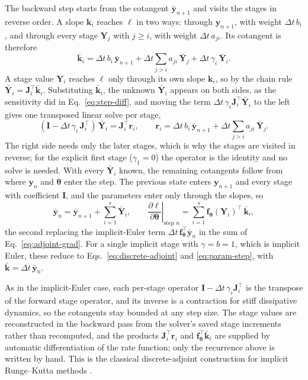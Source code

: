 \documentclass{article}
\begin{document}
The backward step starts from the cotangent \(\bar{\mathbf{y}}_{n+1}\) and visits the stages in reverse order. A slope \(\mathbf{k}_i\) reaches \(\ell\) in two ways: through \(\mathbf{y}_{n+1}\), with weight \(\Delta t\,b_i\), and through every stage \(\mathbf{Y}_j\) with \(j\ge i\), with weight \(\Delta t\,a_{ji}\). Its cotangent is therefore
\[
\bar{\mathbf{k}}_i=\Delta t\,b_i\,\bar{\mathbf{y}}_{n+1}+\Delta t\sum_{j>i}a_{ji}\,\bar{\mathbf{Y}}_j+\Delta t\,\gamma_i\,\bar{\mathbf{Y}}_i .
\]
A stage value \(\mathbf{Y}_i\) reaches \(\ell\) only through its own slope \(\mathbf{k}_i\), so by the chain rule \(\bar{\mathbf{Y}}_i=\mathbf{J}_i^{\top}\bar{\mathbf{k}}_i\). Substituting \(\bar{\mathbf{k}}_i\), the unknown \(\bar{\mathbf{Y}}_i\) appears on both sides, as the sensitivity did in Eq.~\eqref{eq:step-diff}, and moving the term \(\Delta t\,\gamma_i\mathbf{J}_i^{\top}\bar{\mathbf{Y}}_i\) to the left gives one transposed linear solve per stage,
\[
(\mathbf{I}-\Delta t\,\gamma_i\,\mathbf{J}_i^{\top})\,\bar{\mathbf{Y}}_i=\mathbf{J}_i^{\top}\mathbf{r}_i,
\qquad
\mathbf{r}_i=\Delta t\,b_i\,\bar{\mathbf{y}}_{n+1}+\Delta t\sum_{j>i}a_{ji}\,\bar{\mathbf{Y}}_j .
\]
The right side needs only the later stages, which is why the stages are visited in reverse; for the explicit first stage (\(\gamma_1=0\)) the operator is the identity and no solve is needed. With every \(\bar{\mathbf{Y}}_i\) known, the remaining cotangents follow from where \(\mathbf{y}_n\) and \(\boldsymbol{\theta}\) enter the step. The previous state enters \(\mathbf{y}_{n+1}\) and every stage with coefficient \(\mathbf{I}\), and the parameters enter only through the slopes, so
\[
\bar{\mathbf{y}}_n=\bar{\mathbf{y}}_{n+1}+\sum_{i=1}^{s}\bar{\mathbf{Y}}_i,
\qquad
\left.\frac{\partial\ell}{\partial\boldsymbol{\theta}}\right|_{\text{step }n}=\sum_{i=1}^{s}\mathbf{f}_{\boldsymbol{\theta}}(\mathbf{Y}_i)^{\top}\,\bar{\mathbf{k}}_i ,
\]
the second replacing the implicit-Euler term \(\Delta t\,\mathbf{f}_{\boldsymbol{\theta}}^{\top}\bar{\mathbf{y}}_n\) in the sum of Eq.~\eqref{eq:adjoint-grad}. For a single implicit stage with \(\gamma=b=1\), which is implicit Euler, these reduce to Eqs.~\eqref{eq:discrete-adjoint} and \eqref{eq:param-step}, with \(\bar{\mathbf{k}}=\Delta t\,\bar{\mathbf{y}}_n\).

As in the implicit-Euler case, each per-stage operator \(\mathbf{I}-\Delta t\,\gamma_i\mathbf{J}_i^{\top}\) is the transpose of the forward stage operator, and its inverse is a contraction for stiff dissipative dynamics, so the cotangents stay bounded at any step size. The stage values are reconstructed in the backward pass from the solver's saved stage increments rather than recomputed, and the products \(\mathbf{J}_i^{\top}\mathbf{r}_i\) and \(\mathbf{f}_{\boldsymbol{\theta}}^{\top}\bar{\mathbf{k}}_i\) are supplied by automatic differentiation of the rate function; only the recurrence above is written by hand. This is the classical discrete-adjoint construction for implicit Runge--Kutta methods \citep{sandu2003, zhang2014}.
\end{document}
